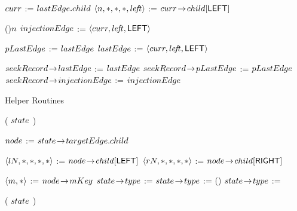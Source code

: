 \begin{limitscope}
\begin{algorithm}[!thb]
{	 %
	 	
	 \While{\True}
	 {
	    $curr$ := $lastEdge.child$\;
      $\langle  n, \ast, \ast, \ast, le\!f\!t  \rangle$ := $curr \!\rightarrow\! child[\textsf{LEFT}]$\;
			
			\If(){$n$}	
			{
			   $injectionEdge$ := $\langle curr, le\!f\!t, \textsf{LEFT} \rangle$\;
			   \Break\;
			}
				
			\BlankLine
			
			$pLastEdge$ := $lastEdge$\;
	    $lastEdge$ := $\langle  curr, le\!f\!t, \textsf{LEFT}  \rangle$\;
		
			
	 }
	
	 \BlankLine
	 $seekRecord \!\rightarrow\! lastEdge$ := $lastEdge$\;
	 $seekRecord \!\rightarrow\! pLastEdge$ := $pLastEdge$\;
   $seekRecord \!\rightarrow\! injectionEdge$ := $injectionEdge$\;
	 \Return \True\;
	
}




\caption{Helper Routines}
\label{algo:helper|1}
\end{algorithm}


\begin{algorithm}[!thb]
\DefineKeyWords


\DontPrintSemicolon
\InitializeTypeAndUpdateMode( $state$ )\;
\PrintSemicolon
\Begin
{

   $node$ := $state \!\rightarrow\! targetEdge.child$\;
	 
	
	 \BlankLine
	 $\langle  lN, \ast, \ast, \ast, \ast  \rangle$ := $node \!\rightarrow\! child[\textsf{LEFT}]$\;
	 $\langle  rN, \ast, \ast, \ast, \ast  \rangle$ := $node \!\rightarrow\! child[\textsf{RIGHT}]$\;
	
	 \uIf{$\lNFlag$ \LOr $\rNFlag$}
	 {
	    $\langle m, \ast  \rangle$ := $node \!\rightarrow\! mKey$\;
	    \lIf{$\mFlag$}
	    {
	      $state \!\rightarrow\! type$ := \COMPLEX
	    }
	    \lElse
	    {
	      $state \!\rightarrow\! type$ := \SIMPLE
	     }
	 }
	 \Else()
	 {
	    $state \!\rightarrow\! type$ := \COMPLEX\;
	 }
	
	 \UpdateMode( $state$ )\;
	

}
\end{algorithm}
\end{limitscope}
